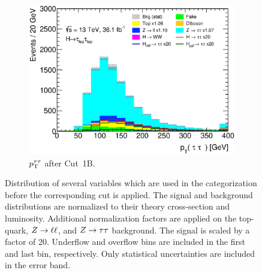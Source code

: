 \begin{figure}[htb]
\begin{subfigure}[t]{0.45\textwidth}
        \includegraphics[width=\textwidth]{./plots/event_selection/categories/ll-CutBoostedCatNoVBF-PtTauTau-lin.eps}
        \caption{$p_\text{T}^{\tau\tau}$ after Cut~1B.}\label{fig:event_selection:cutflow:boosted:pttautau}
    \end{subfigure}
    \caption{Distribution of several variables which are used in the categorization before the corresponding cut is applied.
             The signal and background distributions are normalized to their theory cross-section and luminosity.
             Additional normalization factors are applied on the top-quark, $Z \to \ell \ell$, and $Z \to \tau \tau$ background.
             The signal is scaled by a factor of 20.
             Underflow and overflow bins are included in the first and last bin, respectively.
             Only statistical uncertainties are included in the error band.}\label{fig:event_selection:cutflow:2}
\end{figure}




